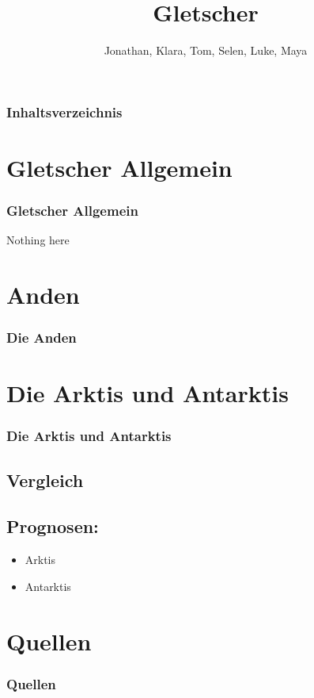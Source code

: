 \documentclass{beamer}
\title{Gletscher}
\author{Jonathan, Klara, Tom, Selen, Luke, Maya}
\institute{ESG}
\begin{document}
\maketitle

\begin{frame}
  \frametitle{Inhaltsverzeichnis}
  \tableofcontents
\end{frame}

\section{Gletscher Allgemein}
\begin{frame}
  \frametitle{Gletscher Allgemein}
  Nothing here
\end{frame}

\section{Anden}
\begin{frame}
  \frametitle{Die Anden}
\end{frame}

\begin{markdown}
\section{Die Arktis und Antarktis}
\begin{frame}
  \frametitle{Die Arktis und Antarktis}
  \subsection{Vergleich}
    \subsection{Prognosen:}
    \begin{itemize}
      \item Arktis
      \item Antarktis
    \end{itemize}



\end{frame}


\section{Quellen}
\begin{frame}
\renewcommand{\bibfont}{\footnotesize}
\frametitle{Quellen}




\end{frame}
\end{markdown}
\end{document}
